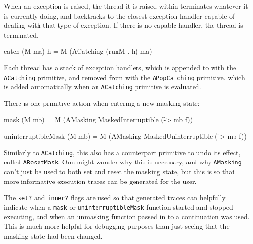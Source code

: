 When an exception is raised, the thread it is raised within terminates
whatever it is currently doing, and backtracks to the closest
exception handler capable of dealing with that type of exception. If
there is no capable handler, the thread is terminated.

\begin{haskellcode}
catch (M ma) h = M (ACatching (runM . h) ma)
\end{haskellcode}


Each thread has a stack of exception handlers, which is appended to
with the \verb|ACatching| primitive, and removed from with the
\verb|APopCatching| primitive, which is added automatically when an
\verb|ACatching| primitive is evaluated.


There is one primitive action when entering a new masking state:

\begin{haskellcode}
mask (M mb) = M (AMasking MaskedInterruptible (\f -> mb f))

uninterruptibleMask (M mb) = M (AMasking MaskedUninterruptible
  (\f -> mb f))
\end{haskellcode}


Similarly to \verb|ACatching|, this also has a counterpart primitive
to undo its effect, called \verb|AResetMask|. One might wonder why
this is necessary, and why \verb|AMasking| can't just be used to both
set and reset the masking state, but this is so that more informative
execution traces can be generated for the user.


The \verb|set?| and \verb|inner?| flags are used so that generated
traces can helpfully indicate when a \verb|mask| or
\verb|uninterruptibleMask| function started and stopped executing, and
when an unmasking function passed in to a continuation was used. This
is much more helpful for debugging purposes than just seeing that the
masking state had been changed.

